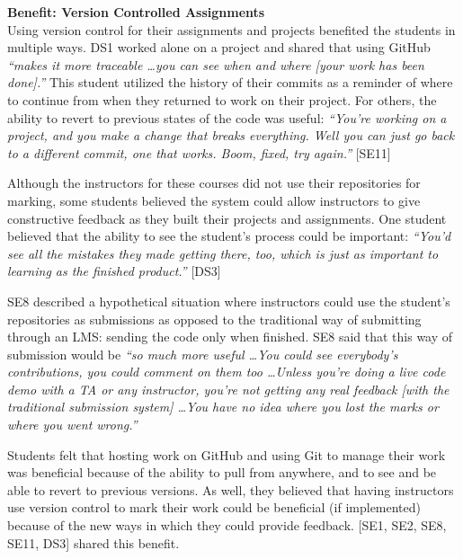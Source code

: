 \textbf{Benefit: Version Controlled Assignments} \\
Using version control for their assignments and projects benefited the students in multiple ways. DS1 worked alone on a project and shared that using GitHub \textit{``makes it more traceable \ldots you can see when and where [your work has been done].''} This student utilized the history of their commits as a reminder of where to continue from when they returned to work on their project. For others, the ability to revert to previous states of the code was useful: \textit{``You're working on a project, and you make a change that breaks everything. Well you can just go back to a different commit, one that works. Boom, fixed, try again.''} [SE11]

Although the instructors for these courses did not use their repositories for marking, some students believed the system could allow instructors to give constructive feedback as they built their projects and assignments. One student believed that the ability to see the student's process could be important: \textit{``You'd see all the mistakes they made getting there, too, which is just as important to learning as the finished product.''} [DS3]

SE8 described a hypothetical situation where instructors could use the student's repositories as submissions as opposed to the traditional way of submitting through an LMS: sending the code only when finished. SE8 said that this way of submission would be \textit{``so much more useful \ldots You could see everybody's contributions, you could comment on them too \ldots Unless you're doing a live code demo with a TA or any instructor, you're not getting any real feedback [with the traditional submission system] \ldots You have no idea where you lost the marks or where you went wrong.''}

Students felt that hosting work on GitHub and using Git to manage their work was beneficial because of the ability to pull from anywhere, and to see and be able to revert to previous versions. As well, they believed that having instructors use version control to mark their work could be beneficial (if implemented) because of the new ways in which they could provide feedback. [SE1, SE2, SE8, SE11, DS3] shared this benefit. \\


